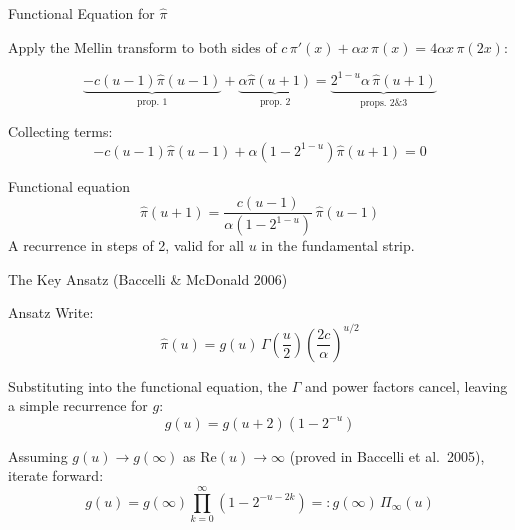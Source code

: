\documentclass[aspectratio=169]{beamer}
\begin{document}
\begin{frame}{Functional Equation for $\hat{\pi}$}

  Apply the Mellin transform to both sides of
  $c\,\pi'(x) + \alpha x\,\pi(x) = 4\alpha x\,\pi(2x)$:

  \bigskip
  \[
    \underbrace{-c(u-1)\hat{\pi}(u-1)}_{\text{prop. 1}}
    +
    \underbrace{\alpha\hat{\pi}(u+1)}_{\text{prop. 2}}
    =
    \underbrace{2^{1-u}\alpha\,\hat{\pi}(u+1)}_{\text{props. 2\&3}}
  \]

  \bigskip
  Collecting terms:
  \[
    -c(u-1)\hat{\pi}(u-1) + \alpha(1-2^{1-u})\hat{\pi}(u+1) = 0
  \]

  \bigskip
  \begin{block}{Functional equation}
    \[
      \boxed{
        \hat{\pi}(u+1)
        = \frac{c(u-1)}{\alpha(1-2^{1-u})}\,\hat{\pi}(u-1)
      }
    \]
    A recurrence in steps of 2, valid for all $u$ in the
    fundamental strip.
  \end{block}

\end{frame}

\begin{frame}{The Key Ansatz (Baccelli \& McDonald 2006)}

  \begin{block}{Ansatz}
    Write:
    \[
      \hat{\pi}(u) = g(u)\,\Gamma\!\left(\frac{u}{2}\right)
      \left(\frac{2c}{\alpha}\right)^{u/2}
    \]
  \end{block}

  \bigskip
  Substituting into the functional equation, the $\Gamma$
  and power factors cancel, leaving a simple recurrence
  for $g$:
  \[
    \boxed{g(u) = g(u+2)\left(1-2^{-u}\right)}
  \]

  \bigskip
  Assuming $g(u) \to g(\infty)$ as $\mathrm{Re}(u)\to\infty$
  (proved in Baccelli et al.\ 2005), iterate forward:
  \[
    g(u) = g(\infty)\prod_{k=0}^\infty\left(1-2^{-u-2k}\right)
    =: g(\infty)\,\Pi_\infty(u)
  \]

\end{frame}
\end{document}
